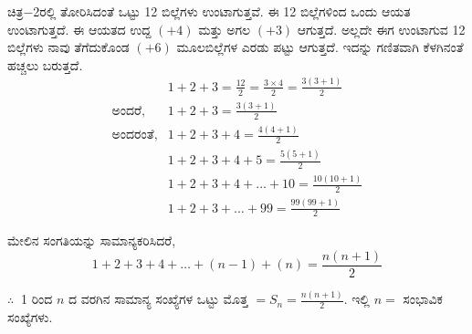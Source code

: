ಚಿತ್ರ$-$2ರಲ್ಲಿ ತೋರಿಸಿದಂತೆ ಒಟ್ಟು 12 ಬಿಲ್ಲೆಗಳು ಉಂಟಾಗುತ್ತವೆ. ಈ 12 ಬಿಲ್ಲೆ\break ಗಳಿಂದ \hbox{ಒಂದು} ಆಯತ ಉಂಟಾಗುತ್ತದೆ. ಈ ಆಯತದ ಉದ್ದ $(+4)$ ಮತ್ತು ಅಗಲ $(+3)$ ಆಗುತ್ತದೆ. ಅಲ್ಲದೇ ಈಗ ಉಂಟಾಗುವ 12 ಬಿಲ್ಲೆಗಳು ನಾವು ತೆಗೆದುಕೊಂಡ $(+6)$ ಮೂಲಬಿಲ್ಲೆಗಳ ಎರಡು ಪಟ್ಟು ಆಗುತ್ತದೆ. ಇದನ್ನು ಗಣಿತವಾಗಿ ಕೆಳಗಿನಂತೆ ಹಚ್ಚಲು ಬರುತ್ತದೆ. 
\begin{align*}
& 1 + 2 + 3 = \frac{12}{2} = \frac{3 \times 4}{2} = \frac{3(3+1)}{2}\\
\text{ಅಂದರೆ}, & 1 + 2 + 3 = \frac{3(3+1)}{2}\\
\text{ಅಂದರಂತೆ}, & 1 + 2 + 3 + 4 = \frac{4(4+1)}{2}\\
& 1 + 2 + 3 + 4 + 5 = \frac{5(5+1)}{2}\\
& 1 + 2 + 3 + 4 + \hdots + 10 = \frac{10(10+1)}{2}\\
& 1 + 2 + 3 + \hdots + 99 = \frac{99(99+1)}{2}
\end{align*}

ಮೇಲಿನ ಸಂಗತಿಯನ್ನು ಸಾಮಾನ್ಯಕರಿಸಿದರೆ,
$$
1 + 2 + 3 + 4 + \hdots + (n-1) + (n) = \frac{n(n+1)}{2}
$$

$\therefore~$ 1 ರಿಂದ $n$ ದ ವರಗಿನ ಸಾಮಾನ್ಯ ಸಂಖ್ಯೆಗಳ ಒಟ್ಟು ಮೊತ್ತ $= S_{n} = \frac{n(n+1)}{2}$. ಇಲ್ಲಿ $n =$ ಸಂಭಾವಿಕ ಸಂಖ್ಯೆಗಳು. 
